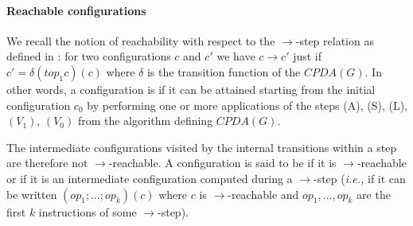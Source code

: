 \documentclass[a4paper]{article}[12pt]
\theoremstyle{remark}
\theoremstyle{definition}
\begin{document}
\begin{figure} 
\begin{center}
\end{center}
\end{figure}



\paragraph{Reachable configurations}
We recall the notion of reachability with respect to the $\rightarrow$-step relation as defined in \cite{hague-collaps-full}: for two configurations $c$ and $c'$ we have $c\rightarrow c'$ just if $c' = \delta(top_1 c)(c)$ where $\delta$ is the transition function of the $CPDA(G)$.
In other words, a configuration is  if it can be attained starting from the initial configuration $c_0$ by performing
one or more applications of the steps (A), (S), (L), $(V_1)$, $(V_0)$ from the algorithm defining $CPDA(G)$.

The intermediate configurations visited by the internal transitions within a step are therefore not $\rightarrow$-reachable.
A configuration is said to be  if it is $\rightarrow$-reachable or if it is
an intermediate configuration computed during a $\rightarrow$-step
({\it i.e.,} if it can be written $(op_1;\ldots;op_k)(c)$ where $c$ is $\rightarrow$-reachable and
$op_1, \ldots, op_k$ are the first $k$ instructions of some $\rightarrow$-step).
\end{document}
